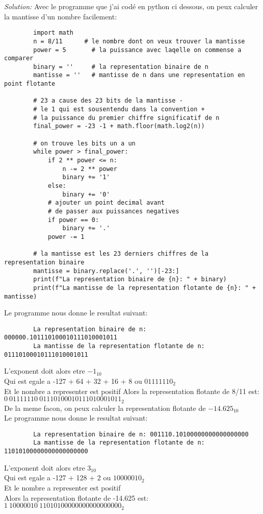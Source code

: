 \documentclass{article}
\newenvironment{solution}
    {\textit{Solution:}}
    {}
\begin{document}
\begin{solution}
    Avec le programme que j'ai codé en python ci dessous, on peux calculer la mantisse d'un nombre facilement:
    \begin{lstlisting}
        import math
        n = 8/11      # le nombre dont on veux trouver la mantisse
        power = 5       # la puissance avec laqelle on commense a comparer
        binary = ''     # la representation binaire de n
        mantisse = ''   # mantisse de n dans une representation en point flotante

        # 23 a cause des 23 bits de la mantisse -
        # le 1 qui est sousentendu dans la convention +
        # la puissance du premier chiffre significatif de n
        final_power = -23 -1 + math.floor(math.log2(n))

        # on trouve les bits un a un
        while power > final_power:
            if 2 ** power <= n:
                n -= 2 ** power
                binary += '1'
            else:
                binary += '0'
            # ajouter un point decimal avant 
            # de passer aux puissances negatives
            if power == 0:
                binary += '.'
            power -= 1

        # la mantisse est les 23 derniers chiffres de la representation binaire
        mantisse = binary.replace('.', '')[-23:]
        print(f"La representation binaire de {n}: " + binary)
        print(f"La mantisse de la representation flotante de {n}: " + mantisse)
    \end{lstlisting}
    Le programme nous donne le resultat suivant:
    \begin{lstlisting}
        La representation binaire de n: 000000.101110100010111010001011
        La mantisse de la representation flotante de n: 01110100010111010001011
    \end{lstlisting}
    L'exponent doit alors etre $-1_{10}$ \\
    Qui est egale a -127 + 64 + 32 + 16 + 8 ou $01111110_2$ \\
    Et le nombre a representer est positif
    Alors la representation flotante de 8/11 est: \\
    $0\ 01111110\ 01110100010111010001011_2$\\
    De la meme facon, on peux calculer la representation flotante de $-14.625_{10}$ \\
    Le programme nous donne le resultat suivant:
    \begin{lstlisting}
        La representation binaire de n: 001110.10100000000000000000
        La mantisse de la representation flotante de n: 11010100000000000000000
    \end{lstlisting}
    L'exponent doit alors etre $3_{10}$ \\
    Qui est egale a -127 + 128 + 2 ou $10000010_2$ \\
    Et le nombre a representer est positif \\
    Alors la representation flotante de -14.625 est: \\
    $1\ 10000010\ 11010100000000000000000_2$
\end{solution}
\end{document}

